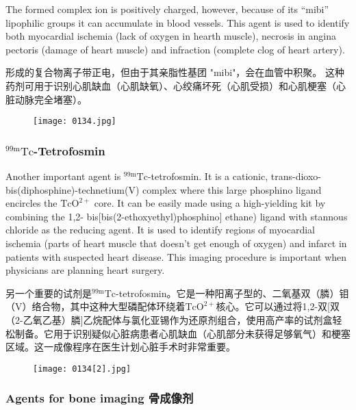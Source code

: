 \documentclass[dvipsnames, svgnames,a4paper,11pt]{article}
\begin{document}
The formed complex ion is positively charged, however, because of its “mibi”
lipophilic groups it can accumulate in blood vessels. This agent is used to identify
both myocardial ischemia (lack of oxygen in hearth muscle), necrosis in angina
pectoris (damage of heart muscle) and infraction (complete clog of heart artery).

形成的复合物离子带正电，但由于其亲脂性基团 "mibi"，会在血管中积聚。 这种药剂可用于识别心肌缺血（心肌缺氧）、心绞痛坏死（心肌受损）和心肌梗塞（心脏动脉完全堵塞）。

\begin{figure}[h]
	\centering
    \texttt{[image: 0134.jpg]}    
     \label{fig135}
\end{figure}

\subsubsection{${}^\mathrm{99m}\mathrm{Tc}$-Tetrofosmin }

Another important agent is ${}^\mathrm{99m}\mathrm{Tc}$-tetrofosmin. It is a cationic, trans-dioxo-
bis(diphosphine)-technetium(V) complex where this large phosphino ligand encircles
the $\mathrm{TcO^{2+}}$ core. It can be easily made using a high-yielding kit by combining the 1,2-
bis[bis(2-ethoxyethyl)phosphino] ethane) ligand with stannous chloride as the
reducing agent. It is used to identify regions of myocardial ischemia (parts of heart
muscle that doesn't get enough of oxygen) and infarct in patients with suspected
heart disease. This imaging procedure is important when physicians are planning
heart surgery.

 另一个重要的试剂是${}^\mathrm{99m}\mathrm{Tc}$-tetrofosmin。它是一种阳离子型的、二氧基双（膦）钼（V）络合物，其中这种大型磷配体环绕着$\mathrm{TcO^{2+}}$核心。它可以通过将1,2-双[双（2-乙氧乙基）膦]乙烷配体与氯化亚锡作为还原剂组合，使用高产率的试剂盒轻松制备。它用于识别疑似心脏病患者心肌缺血（心肌部分未获得足够氧气）和梗塞区域。这一成像程序在医生计划心脏手术时非常重要。

 \begin{figure}[h]
	\centering
    \texttt{[image: 0134[2].jpg]}    
     \label{fig136}
\end{figure}

\subsubsection{Agents for bone imaging 骨成像剂 }
\end{document}
